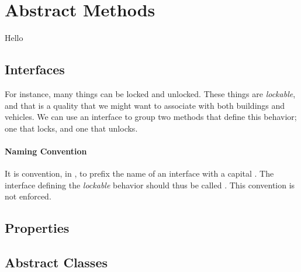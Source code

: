 \chapter{Abstract Methods}

Hello

\section{Interfaces}
\csharpsubsection{\csharp}


For instance, many things can be locked and unlocked. These things are \textsl{lockable}, and that is a quality that we might want to associate with both buildings and vehicles. We can use an interface to group two methods that define this behavior; one that locks, and one that unlocks.




\begin{syntaxfloat}
  
  \caption{Interface definitions.}
  \label{syntax:interface}
\end{syntaxfloat}

\begin{syntaxfloat}
  
  \caption{Class and namespace update to allow for interface implementation.}
  \label{syntax:interface:update}
\end{syntaxfloat}

\subsubsection{Naming Convention}

It is convention, in \csharp, to prefix the name of an interface with a capital . The interface defining the \textsl{lockable} behavior should thus be called . This convention is not enforced.

\section{Properties}
\label{sec:property}

\section{Abstract Classes}
\csharpsubsection{\csharp}

\begin{syntaxfloat}
  
  \caption{Abstract class definitions.}
  \label{syntax:absclass}
\end{syntaxfloat}


